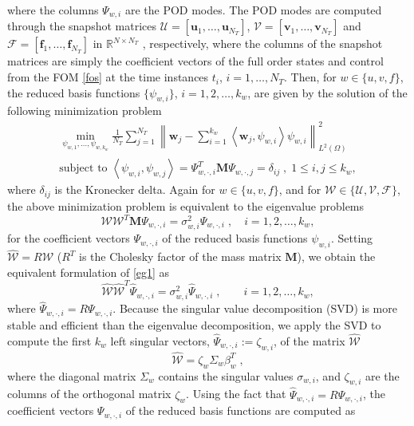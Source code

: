 \documentclass[preprint,12pt]{elsarticle}
\newcommand {\la}[1] {\left\langle {#1} \right\rangle }
\begin{document}
where the columns $\Psi_{w,i}$ are the POD modes.
The POD modes are computed through the snapshot matrices $\mathcal{U}=[\bm{u}_1,\ldots ,\bm{u}_{N_T}]$, $\mathcal{V}=[\bm{v}_1,\ldots ,\bm{v}_{N_T}]$ and $\mathcal{F}=[\bm{f}_1,\ldots ,\bm{f}_{N_T}]$ in $\mathbb{R}^{N\times N_T}$ \cite{Karasozen15,Kunisch01}, respectively, where the columns of the snapshot matrices are simply the coefficient vectors of the full order states and control from the FOM \eqref{fos} at the time instances $t_i$,  $i=1,\ldots , N_T$. Then, for $w\in\{u,v,f\}$, the reduced basis functions $\{\psi_{w,i}\}$, $i=1,2,\ldots , k_w$, are given by the solution of the following minimization problem
\begin{align*}
\min_{\psi_{w,1},\ldots ,\psi_{w,k_w}} \frac{1}{N_T}\sum_{j=1}^{N_T} \left\| \bm{w}_j - \sum_{i=1}^{k_w} \la{\bm{w}_j,\psi_{w,i}}\psi_{w,i}\right\|_{L^2(\Omega)}^2 \\
\text{subject to } \la{\psi_{w,i},\psi_{w,j}} = \Psi_{w,\cdot ,i}^T{\bm M}\Psi_{w,\cdot ,j}=\delta_{ij} \; , \; 1\leq i,j\leq k_w,
\end{align*}
where $\delta_{ij}$ is the Kronecker delta. Again for $w\in\{u,v,f\}$, and for $\mathcal{W}\in\{\mathcal{U},\mathcal{V},\mathcal{F}\}$, the above minimization problem is equivalent to the eigenvalue problems
\begin{equation}\label{eg1}
\mathcal{W}\mathcal{W}^T{\bm M}\Psi_{w,\cdot ,i}=\sigma_{w,i}^2\Psi_{w,\cdot ,i} \; , \quad i=1,2,\ldots ,k_w,
\end{equation}
for the coefficient vectors $\Psi_{w,\cdot ,i}$ of the reduced basis functions $\psi_{w,i}$. Setting $\widehat{\mathcal{W}}=R\mathcal{W}$ ($R^T$ is the Cholesky factor of the mass matrix ${\bm M}$), we obtain the equivalent formulation of  \eqref{eg1} as
\begin{equation*}
\widehat{\mathcal{W}}\widehat{\mathcal{W}}^T\widehat{\Psi}_{w,\cdot ,i}=\sigma_{w,i}^2\widehat{\Psi}_{w,\cdot ,i} \; , \quad \quad i=1,2,\ldots ,k_w,
\end{equation*}
where $\widehat{\Psi}_{w,\cdot ,i}=R\Psi_{w,\cdot ,i}$.
Because the singular value decomposition (SVD) is more stable and efficient than the eigenvalue decomposition, we apply the SVD to compute the first $k_w$ left singular vectors, $\widehat{\Psi}_{w,\cdot ,i}:=\zeta_{w,i}$, of the  matrix $\widehat{\mathcal{W}}$
\begin{equation*}
\widehat{\mathcal{W}} = \zeta_{w}\Sigma_w \beta_w^T \; ,
\end{equation*}
where the diagonal matrix $\Sigma_w$ contains the singular values $\sigma_{w,i}$, and $\zeta_{w,i}$ are the columns of the orthogonal matrix $\zeta_{w}$. Using  the fact that $\widehat{\Psi}_{w,\cdot ,i}=R\Psi_{w,\cdot ,i}$, the coefficient vectors $\Psi_{w,\cdot ,i}$ of the reduced basis functions are computed as
\end{document}
